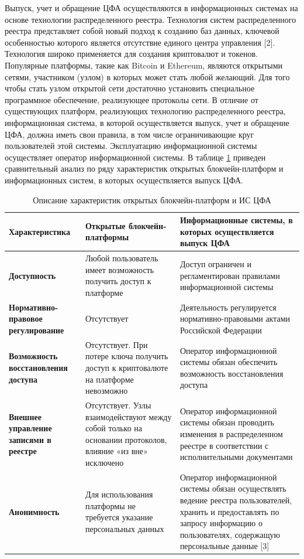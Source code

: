 \documentclass[a4paper, 10pt]{article}
\begin{document}
	Выпуск, учет и обращение ЦФА осуществляются в информационных системах на основе технологии распределенного реестра. Технология систем распределенного реестра представляет собой новый подход к созданию баз данных, ключевой особенностью которого является отсутствие единого центра управления [2]. Технология широко применяется для создания криптовалют и токенов. Популярные платформы, такие как Bitcoin и Ethereum, являются открытыми сетями, участником (узлом) в которых может стать любой желающий. Для того чтобы стать узлом открытой сети достаточно установить специальное программное обеспечение, реализующее протоколы сети. В отличие от существующих платформ, реализующих технологию распределенного реестра, информационная система, в которой осуществляется выпуск, учет и обращение ЦФА, должна иметь свои правила, в том числе ограничивающие круг пользователей этой системы. Эксплуатацию информационной системы осуществляет оператор информационной системы. В таблице \ref{table:characteristics} приведен сравнительный анализ по ряду характеристик открытых блокчейн-платформ и информационных систем, в которых осуществляется выпуск ЦФА.
	
	\begin{longtable}{|p{3.5cm}|p{6.1cm}|p{6.2cm}|}
		\caption{Описание характеристик открытых блокчейн-платформ и ИС ЦФА}
		\label{table:characteristics}\\
		\hline
		
		\textbf{Характеристика} 
		& \textbf{Открытые блокчейн-платформы} 
		& \textbf{Информационные системы, в которых осуществляется выпуск ЦФА}\\
		\hline
		
		\textbf{Доступность}
		& Любой пользователь имеет возможность получить доступ к платформе
		& Доступ ограничен и регламентирован правилами информационной системы\\
		\hline
		
		\textbf{Нормативно-правовое регулирование}
		& Отсутствует
		& Деятельность регулируется нормативно-правовыми актами Российской Федерации\\
		\hline
		
		\textbf{Возможность восстановления доступа}
		& Отсутствует. При потере ключа получить доступ к криптовалюте на платформе невозможно
		& Оператор информационной системы обязан обеспечить возможность восстановления доступа\\
		\hline
		
		\textbf{Внешнее управление записями в реестре}
		& Отсутствует. Узлы взаимодействуют между собой только на основании протоколов, влияние «из вне» исключено
		& Оператор информационной системы обязан проводить изменения в распределенном реестре в соответствии с исполнительными документами\\
		\hline
		
		\textbf{Анонимность}
		& Для использования платформы не требуется указание персональных данных
		& Оператор информационной системы обязан осуществлять ведение реестра пользователей, хранить и предоставлять по запросу информацию о пользователях, содержащую персональные данные [3]\\
		\hline
	\end{longtable}
	
\end{document}
